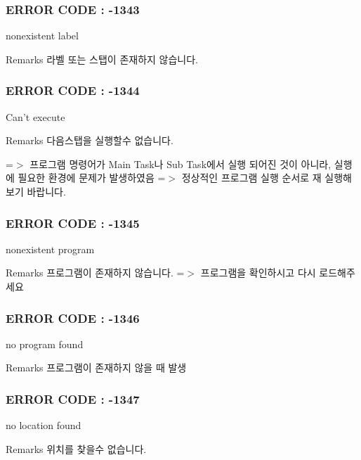  \subsubsection*{E\-R\-R\-O\-R C\-O\-D\-E \-: -\/1343 }

nonexistent label \begin{DoxyRemark}{Remarks}
라벨 또는 스탭이 존재하지 않습니다.
\end{DoxyRemark}


 \subsubsection*{E\-R\-R\-O\-R C\-O\-D\-E \-: -\/1344 }

Can't execute \begin{DoxyRemark}{Remarks}
다음스탭을 실행할수 없습니다. \par
 =$>$ 프로그램 명령어가 Main Task나 Sub Task에서 실행 되어진 것이 아니라, 실행에 필요한 환경에 문제가 발생하였음 =$>$ 정상적인 프로그램 실행 순서로 재 실행해 보기 바랍니다.
\end{DoxyRemark}


 \subsubsection*{E\-R\-R\-O\-R C\-O\-D\-E \-: -\/1345 }

nonexistent program \begin{DoxyRemark}{Remarks}
프로그램이 존재하지 않습니다. =$>$ 프로그램을 확인하시고 다시 로드해주세요
\end{DoxyRemark}


 \subsubsection*{E\-R\-R\-O\-R C\-O\-D\-E \-: -\/1346 }

no program found \begin{DoxyRemark}{Remarks}
프로그램이 존재하지 않을 때 발생
\end{DoxyRemark}


 \subsubsection*{E\-R\-R\-O\-R C\-O\-D\-E \-: -\/1347 }

no location found \begin{DoxyRemark}{Remarks}
위치를 찾을수 없습니다.
\end{DoxyRemark}


